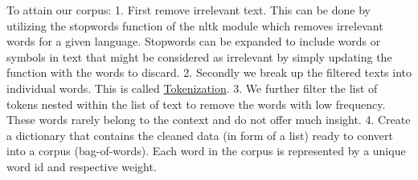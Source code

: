 \documentclass[11pt]{article}
\begin{document}
To attain our corpus: 1. First remove irrelevant text. This can be done
by utilizing the stopwords function of the nltk module which removes
irrelevant words for a given language. Stopwords can be expanded to
include words or symbols in text that might be considered as irrelevant
by simply updating the function with the words to discard. 2. Secondly
we break up the filtered texts into individual words. This is called
\href{https://www.techopedia.com/definition/13698/tokenization}{Tokenization}.
3. We further filter the list of tokens nested within the list of text
to remove the words with low frequency. These words rarely belong to the
context and do not offer much insight. 4. Create a dictionary that
contains the cleaned data (in form of a list) ready to convert into a
corpus (bag-of-words). Each word in the corpus is represented by a
unique word id and respective weight.
\end{document}
